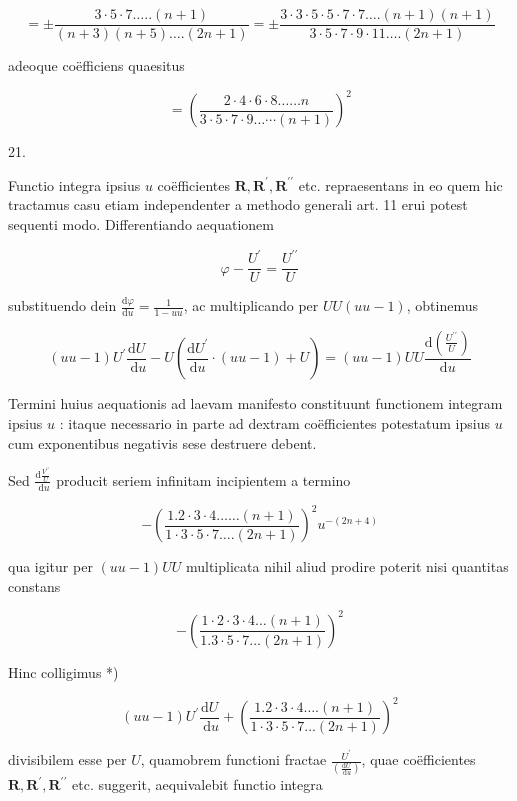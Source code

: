 \documentclass[10pt]{article}
\begin{document}
\[
= \pm \frac{3 \cdot 5 \cdot 7 \ldots . .(n+1)}{(n+3)(n+5) \ldots .(2 n+1)}= \pm \frac{3 \cdot 3 \cdot 5 \cdot 5 \cdot 7 \cdot 7 \ldots .(n+1)(n+1)}{3 \cdot 5 \cdot 7 \cdot 9 \cdot 11 \ldots .(2 n+1)}
\]

adeoque coëfficiens quaesitus

\[
=\left(\frac{2 \cdot 4 \cdot 6 \cdot 8 \ldots \ldots n}{3 \cdot 5 \cdot 7 \cdot 9 \ldots \cdots(n+1)}\right)^{2}
\]

21.

Functio integra ipsius \(u\) coëfficientes \(\boldsymbol{R}, \boldsymbol{R}^{\prime}, \boldsymbol{R}^{\prime \prime}\) etc. repraesentans in eo quem hic tractamus casu etiam independenter a methodo generali art. 11 erui potest sequenti modo. Differentiando aequationem

\[
\varphi-\frac{U^{\prime}}{U}=\frac{U^{\prime \prime}}{U}
\]

substituendo dein \(\frac{\mathrm{d} \varphi}{\mathrm{d} u}=\frac{1}{1-u u}\), ac multiplicando per \(U U(u u-1)\), obtinemus

\[
(u u-1) U^{\prime} \frac{\mathrm{d} U}{\mathrm{~d} u}-U\left(\frac{\mathrm{d} U^{\prime}}{\mathrm{d} u} \cdot(u u-1)+U\right)=(u u-1) U U \frac{\mathrm{d}\left(\frac{U^{\prime \prime}}{U}\right)}{\mathrm{d} u}
\]

Termini huius aequationis ad laevam manifesto constituunt functionem integram ipsius \(u\) : itaque necessario in parte ad dextram coëfficientes potestatum ipsius \(u\) cum exponentibus negativis sese destruere debent.

Sed \(\frac{\mathrm{d} \frac{V^{\prime \prime}}{U}}{\mathrm{~d} u}\) producit seriem infinitam incipientem a termino

\[
-\left(\frac{1.2 \cdot 3 \cdot 4 \ldots \ldots(n+1)}{1 \cdot 3 \cdot 5 \cdot 7 \ldots .(2 n+1)}\right)^{2} u^{-(2 n+4)}
\]

qua igitur per \((u u-1) U U\) multiplicata nihil aliud prodire poterit nisi quantitas constans

\[
-\left(\frac{1 \cdot 2 \cdot 3 \cdot 4 \ldots(n+1)}{1.3 \cdot 5 \cdot 7 \ldots(2 n+1)}\right)^{2}
\]

Hinc colligimus *)

\[
(u u-1) U^{\prime} \frac{\mathrm{d} U}{\mathrm{~d} u}+\left(\frac{1.2 \cdot 3 \cdot 4 \ldots .(n+1)}{1 \cdot 3 \cdot 5 \cdot 7 \ldots(2 n+1)}\right)^{2}
\]

divisibilem esse per \(U\), quamobrem functioni fractae \(\frac{U^{\prime}}{\left(\frac{\mathrm{d} U}{\mathrm{~d} u}\right)}\), quae coëfficientes \(\boldsymbol{R}, \boldsymbol{R}^{\prime}, \boldsymbol{R}^{\prime \prime}\) etc. suggerit, aequivalebit functio integra
\end{document}
